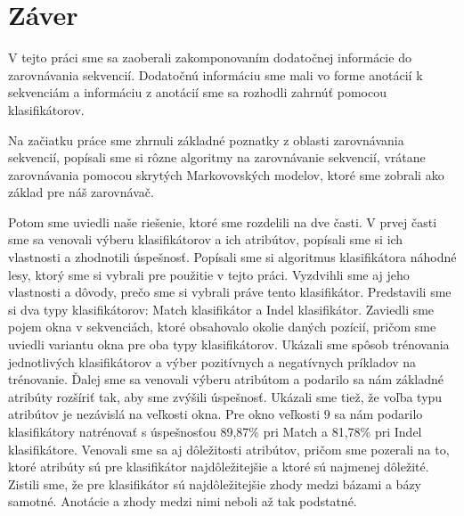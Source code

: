 \chapter*{Záver}

V tejto práci sme sa zaoberali zakomponovaním dodatočnej informácie do zarovnávania sekvencií. Dodatočnú informáciu sme mali vo forme anotácií k sekvenciám a informáciu z anotácií sme sa rozhodli zahrnúť pomocou klasifikátorov.

Na začiatku práce sme zhrnuli základné poznatky z oblasti zarovnávania sekvencií, popísali sme si rôzne algoritmy na zarovnávanie sekvencií, vrátane zarovnávania pomocou skrytých Markovovských modelov, ktoré sme zobrali ako základ pre náš zarovnávač.

Potom sme uviedli naše riešenie, ktoré sme rozdelili na dve časti.
V prvej časti sme sa venovali výberu klasifikátorov a ich atribútov, popísali sme si ich vlastnosti a zhodnotili úspešnosť.
Popísali sme si algoritmus klasifikátora náhodné lesy, ktorý sme si vybrali pre použitie v tejto práci. Vyzdvihli sme aj jeho vlastnosti a dôvody, prečo sme si vybrali práve tento klasifikátor.
Predstavili sme si dva typy klasifikátorov: Match klasifikátor a Indel klasifikátor. Zaviedli sme pojem okna v sekvenciách, ktoré obsahovalo okolie daných pozícií, pričom sme uviedli variantu okna pre oba typy klasifikátorov.
Ukázali sme spôsob trénovania jednotlivých klasifikátorov a výber pozitívnych a negatívnych príkladov na trénovanie.
Ďalej sme sa venovali výberu atribútom a podarilo sa nám základné atribúty rozšíriť tak, aby sme zvýšili úspešnosť. Ukázali sme tiež, že voľba typu atribútov je nezávislá na veľkosti okna. Pre okno veľkosti 9 sa nám podarilo klasifikátory natrénovať s úspešnosťou 89,87\% pri Match a 81,78\% pri Indel klasifikátore. Venovali sme sa aj dôležitosti atribútov, pričom sme pozerali na to, ktoré atribúty sú pre klasifikátor najdôležitejšie a ktoré sú najmenej dôležité. Zistili sme, že pre klasifikátor sú najdôležitejšie zhody medzi bázami a bázy samotné. Anotácie a zhody medzi nimi neboli až tak podstatné.

